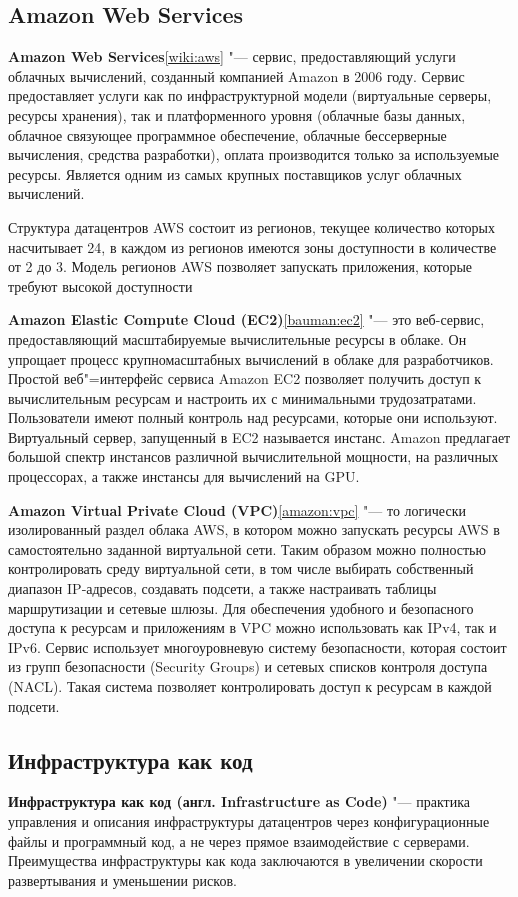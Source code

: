 \documentclass[bachelor, och, pract]{SCWorks}
\begin{document}
\subsection{Amazon Web Services}
\textbf{Amazon Web Services}\ref{wiki:aws} "--- сервис, предоставляющий услуги облачных вычислений, созданный компанией Amazon в 2006 году. Сервис предоставляет услуги как по инфраструктурной модели (виртуальные серверы, ресурсы хранения), так и платформенного уровня (облачные базы данных, облачное связующее программное обеспечение, облачные бессерверные вычисления, средства разработки), оплата производится только за используемые ресурсы. Является одним из самых крупных поставщиков услуг облачных вычислений.

Структура датацентров AWS состоит из регионов, текущее количество которых насчитывает 24, в каждом из регионов имеются зоны доступности в количестве от 2 до 3. Модель регионов AWS позволяет запускать приложения, которые требуют высокой доступности

\textbf{Amazon Elastic Compute Cloud (EC2)}\ref{bauman:ec2} "--- это веб-сервис, предоставляющий масштабируемые вычислительные ресурсы в облаке. Он упрощает процесс крупномасштабных вычислений в облаке для разработчиков. Простой веб"=интерфейс сервиса Amazon EC2 позволяет получить доступ к вычислительным ресурсам и настроить их с минимальными трудозатратами. Пользователи имеют полный контроль над ресурсами, которые они используют. Виртуальный сервер, запущенный в EC2 называется инстанс. Amazon предлагает большой спектр инстансов различной вычислительной мощности, на различных процессорах, а также инстансы для вычислений на GPU.

\textbf{Amazon Virtual Private Cloud (VPC)}\ref{amazon:vpc} "--- то логически изолированный раздел облака AWS, в котором можно запускать ресурсы AWS в самостоятельно заданной виртуальной сети. Таким образом можно полностью контролировать среду виртуальной сети, в том числе выбирать собственный диапазон IP‑адресов, создавать подсети, а также настраивать таблицы маршрутизации и сетевые шлюзы. Для обеспечения удобного и безопасного доступа к ресурсам и приложениям в VPC можно использовать как IPv4, так и IPv6.
Сервис использует многоуровневую систему безопасности, которая состоит из групп безопасности (Security Groups) и сетевых списков контроля доступа (NACL). Такая система позволяет контролировать доступ к ресурсам в каждой подсети.

\subsection{Инфраструктура как код}
\textbf{Инфраструктура как код (англ. Infrastructure as Code)} "--- практика управления и описания инфраструктуры датацентров через конфигурационные файлы и программный код, а не через прямое взаимодействие с серверами. Преимущества инфраструктуры как кода заключаются в увеличении скорости развертывания и уменьшении рисков.
\end{document}
